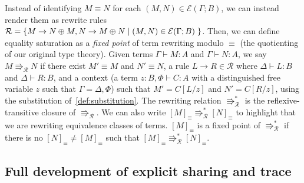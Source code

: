 \begin{example}
  Instead of identifying $M \equiv N$ for each $(M,N) \in \mathcal{E}(\Gamma; B)$, we can instead render them as rewrite rules $\mathcal{R} =\{ M \to N \mathbin{\oplus} M, N \to M \mathbin{\oplus} N \; | \; (M,N) \in \mathcal{E}(\Gamma; B) \; \}$.
  Then, we can define equality saturation as a \emph{fixed point} of term rewriting modulo $\equiv$ (the quotienting of our original type theory).
  Given terms $\Gamma \vdash M : A$ and $\Gamma \vdash N : A$, we say $M \Rrightarrow_{\mathcal{R}} N$ if there exist $M' \equiv M$ and $N' \equiv N$, a rule $L \to R \in \mathcal{R}$ where $\Delta \vdash L : B$ and $\Delta \vdash R : B$, and a context (a term $z : B, \Phi \vdash C : A$ with a distinguished free variable $z$ such that $\Gamma = \Delta, \Phi$) such that $M' = C[L/z]$ and $N' = C[R/z]$, using the substitution of~\autoref{def:substitution}.
  The rewriting relation $\Rrightarrow_{\mathcal{R}}^{*}$ is the reflexive-transitive closure of $\Rrightarrow_{\mathcal{R}}$.
  We can also write $[M]_{\equiv} \Rrightarrow_{\mathcal{R}}^{*} [N]_{\equiv}$ to highlight that we are rewriting equivalence classes of terms.
  $[M]_{\equiv}$ is a fixed point of $\Rrightarrow_{\mathcal{R}}^{*}$ if there is no $[N]_{\equiv} \not = [M]_{\equiv}$ such that $[M]_{\equiv} \Rrightarrow_{\mathcal{R}}^{*} [N]_{\equiv}$.
\end{example}

\subsection{Full development of explicit sharing and trace}
\label{app:sharing-trace-details}

